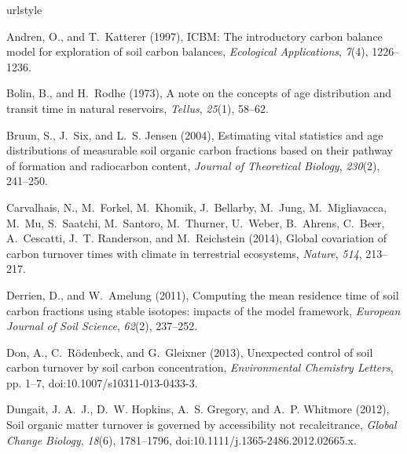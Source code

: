 \documentclass[draft,linenumbers]{agujournal}
\begin{document}
%
\begin{thebibliography}{41}
\providecommand{\natexlab}[1]{#1}
\expandafter\ifx\csname urlstyle\endcsname\relax
  \providecommand{\doi}[1]{doi:\discretionary{}{}{}#1}\else
  \providecommand{\doi}{doi:\discretionary{}{}{}\begingroup
  \urlstyle{rm}\Url}\fi

Andren, O., and T.~Katterer (1997), {ICBM}: The introductory carbon balance
  model for exploration of soil carbon balances, \textit{Ecological
  Applications}, \textit{7}(4), 1226--1236.

Bolin, B., and H.~Rodhe (1973), A note on the concepts of age distribution and
  transit time in natural reservoirs, \textit{Tellus}, \textit{25}(1), 58--62.

Bruun, S., J.~Six, and L.~S. Jensen (2004), Estimating vital statistics and age
  distributions of measurable soil organic carbon fractions based on their
  pathway of formation and radiocarbon content, \textit{Journal of Theoretical
  Biology}, \textit{230}(2), 241--250.

Carvalhais, N., M.~Forkel, M.~Khomik, J.~Bellarby, M.~Jung, M.~Migliavacca,
  M.~Μu, S.~Saatchi, M.~Santoro, M.~Thurner, U.~Weber, B.~Ahrens, C.~Beer,
  A.~Cescatti, J.~T. Randerson, and M.~Reichstein (2014), Global covariation of
  carbon turnover times with climate in terrestrial ecosystems,
  \textit{Nature}, \textit{514}, 213--217.

Derrien, D., and W.~Amelung (2011), Computing the mean residence time of soil
  carbon fractions using stable isotopes: impacts of the model framework,
  \textit{European Journal of Soil Science}, \textit{62}(2), 237--252.

Don, A., C.~R{\"o}denbeck, and G.~Gleixner (2013), Unexpected control of soil
  carbon turnover by soil carbon concentration, \textit{Environmental Chemistry
  Letters}, pp. 1--7, \doi{10.1007/s10311-013-0433-3}.

Dungait, J. A.~J., D.~W. Hopkins, A.~S. Gregory, and A.~P. Whitmore (2012),
  Soil organic matter turnover is governed by accessibility not recalcitrance,
  \textit{Global Change Biology}, \textit{18}(6), 1781--1796,
  \doi{10.1111/j.1365-2486.2012.02665.x}.


\end{thebibliography}
\end{document}
